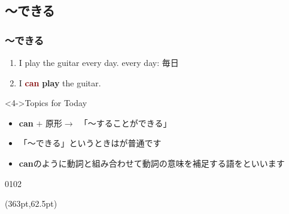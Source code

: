 \documentclass[aspectratio=169,xcolor={dvipsnames,table}]{beamer}
\newcommand{\myaudio}[1]{\href{#1}{\faVolumeUp}}
\begin{document}
\subsection{〜できる}
\begin{frame}[plain]\frametitle{〜できる}
 \Large

\begin{enumerate}
 \item<2-> I play the guitar every day. \hfill{\scriptsize every day: 毎日}
 \item<3-> I \textcolor{Maroon}{\bfseries can} {\bfseries play} the guitar.
\end{enumerate}

\vspace{60pt}

\begin{block}<4->{Topics for Today}
\begin{itemize}[square]\small
 \item<4->   {\bfseries can} $+$ 原形$\longrightarrow${\,\,\,}「〜することができる」
 \item<6-> \<「～できる」というときはが普通です
 \item<7-> \textbf{can}のように動詞と組み合わせて動詞の意味を補足する語をといいます
 \end{itemize}
     \end{block}

\vspace*{-20pt}

\mbox{}\hfill{\tiny 0102}\,{\scriptsize \myaudio{./audio/012_can_01.mp3}} 

\begin{textblock*}{0.4\linewidth}(363pt,62.5pt)
\end{textblock*}

\end{frame}
\end{document}
